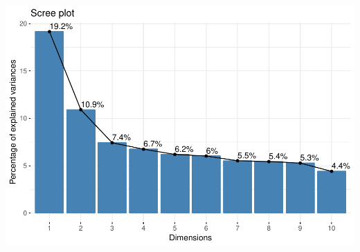 \documentclass[]{article}
\begin{document}
\includegraphics{1_b_Simple_RMarkdown_PDF_files/figure-latex/visualize_ca_scree-1.pdf}
\end{document}
